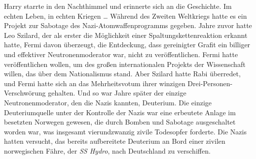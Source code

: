 Harry starrte in den Nachthimmel und erinnerte sich an die Geschichte.
Im echten Leben, in echten Kriegen …
Während des Zweiten Weltkriegs hatte es ein Projekt zur Sabotage des Nazi-Atomwaffenprogramms gegeben. Jahre zuvor hatte Leo Szilard, der als erster die Möglichkeit einer Spaltungskettenreaktion erkannt hatte, Fermi davon überzeugt, die Entdeckung, dass gereinigter Grafit ein billiger und effektiver Neutronenmoderator war, nicht zu veröffentlichen. Fermi hatte veröffentlichen wollen, um des großen internationalen Projekts der Wissenschaft willen, das über dem Nationalismus stand. Aber Szilard hatte Rabi überredet, und Fermi hatte sich an das Mehrheitsvotum ihrer winzigen Drei-Personen-Verschwörung gehalten. Und so war Jahre später der einzige Neutronenmoderator, den die Nazis kannten, Deuterium.
Die einzige Deuteriumquelle unter der Kontrolle der Nazis war eine erbeutete Anlage im besetzten Norwegen gewesen, die durch Bomben und Sabotage ausgeschaltet worden war, was insgesamt vierundzwanzig zivile Todesopfer forderte.
Die Nazis hatten versucht, das bereits aufbereitete Deuterium an Bord einer zivilen norwegischen Fähre, der \emph{SS Hydro}, nach Deutschland zu verschiffen.
